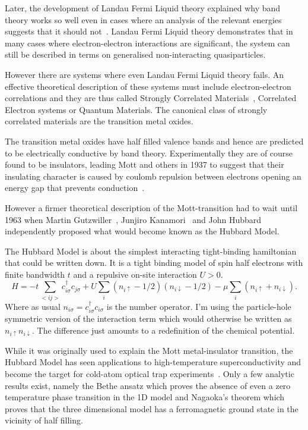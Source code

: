Later, the development of Landau Fermi Liquid theory explained why band theory works so well even in cases where an analysis of the relevant energies suggests that it should not~\autocite{wenQuantumFieldTheory2007}. Landau Fermi Liquid theory demonstrates that in many cases where electron-electron interactions are significant, the system can still be described in terms on generalised non-interacting quasiparticles.

However there are systems where even Landau Fermi Liquid theory fails. An effective theoretical description of these systems must include electron-electron correlations and they are thus called Strongly Correlated Materials~\autocite{morosanStronglyCorrelatedMaterials2012}, Correlated Electron systems or Quantum Materials. The canonical class of strongly correlated materials are the transition metal oxides.

The transition metal oxides have half filled valence bands and hence are predicted to be electrically conductive by band theory. Experimentally they are of course found to be insulators, leading Mott and others in 1937 to suggest that their insulating character is caused by coulomb repulsion between electrons opening an energy gap that prevents conduction~\autocite{mottDiscussionPaperBoer1937}.

However a firmer theoretical description of the Mott-transition had to wait until 1963 when Martin Gutzwiller~\autocite{gutzwillerEffectCorrelationFerromagnetism1963}, Junjiro Kanamori~\autocite{kanamoriElectronCorrelationFerromagnetism1963} and John Hubbard~\autocite{hubbardj.ElectronCorrelationsNarrow1963} independently proposed what would become known as the Hubbard Model.

The Hubbard Model is about the simplest interacting tight-binding hamiltonian that could be written down. It is a tight binding model of spin half electrons with finite bandwidth \(t\) and a repulsive on-site interaction \(U > 0\). \[H = -t\sum_{<ij>}c^\dag_{i\sigma}c_{j\sigma} + U \sum_{i} (n_{i \uparrow} - 1/2)( n_{i\downarrow} - 1/2) - \mu \sum_i \left( n_{i \uparrow} + n_{i \downarrow} \right).\] Where as usual \(n_{i \sigma} = c^\dag_{i\sigma}c_{i\sigma}\) is the number operator. I'm using the particle-hole symmetric version of the interaction term which would otherwise be written as \(n_{i \uparrow} n_{i\downarrow}\). The difference just amounts to a redefinition of the chemical potential.

While it was originally used to explain the Mott metal-insulator transition, the Hubbard Model has seen applications to high-temperature superconductivity and become the target for cold-atom optical trap experiments~\autocite{noauthor_hubbard_2013,greiner_quantum_2002,jordens_mott_2008}. Only a few analytic results exist, namely the Bethe ansatz \autocite{lieb_absence_1968} which proves the absence of even a zero temperature phase transition in the 1D model and Nagaoka's theorem \autocite{nagaoka_ferromagnetism_1966} which proves that the three dimensional model has a ferromagnetic ground state in the vicinity of half filling.

